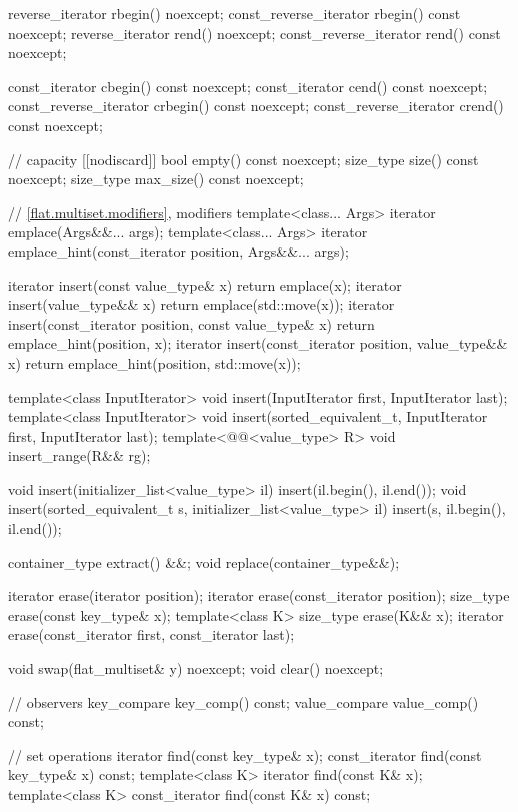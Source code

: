 \begin{codeblock}
{{    reverse_iterator       rbegin() noexcept;
    const_reverse_iterator rbegin() const noexcept;
    reverse_iterator       rend() noexcept;
    const_reverse_iterator rend() const noexcept;

    const_iterator         cbegin() const noexcept;
    const_iterator         cend() const noexcept;
    const_reverse_iterator crbegin() const noexcept;
    const_reverse_iterator crend() const noexcept;

    // capacity
    [[nodiscard]] bool empty() const noexcept;
    size_type size() const noexcept;
    size_type max_size() const noexcept;

    // \ref{flat.multiset.modifiers}, modifiers
    template<class... Args> iterator emplace(Args&&... args);
    template<class... Args>
      iterator emplace_hint(const_iterator position, Args&&... args);

    iterator insert(const value_type& x)
      { return emplace(x); }
    iterator insert(value_type&& x)
      { return emplace(std::move(x)); }
    iterator insert(const_iterator position, const value_type& x)
      { return emplace_hint(position, x); }
    iterator insert(const_iterator position, value_type&& x)
      { return emplace_hint(position, std::move(x)); }

    template<class InputIterator>
      void insert(InputIterator first, InputIterator last);
    template<class InputIterator>
      void insert(sorted_equivalent_t, InputIterator first, InputIterator last);
    template<@@<value_type> R>
      void insert_range(R&& rg);

    void insert(initializer_list<value_type> il)
      { insert(il.begin(), il.end()); }
    void insert(sorted_equivalent_t s, initializer_list<value_type> il)
      { insert(s, il.begin(), il.end()); }

    container_type extract() &&;
    void replace(container_type&&);

    iterator erase(iterator position);
    iterator erase(const_iterator position);
    size_type erase(const key_type& x);
    template<class K> size_type erase(K&& x);
    iterator erase(const_iterator first, const_iterator last);

    void swap(flat_multiset& y) noexcept;
    void clear() noexcept;

    // observers
    key_compare key_comp() const;
    value_compare value_comp() const;

    // set operations
    iterator find(const key_type& x);
    const_iterator find(const key_type& x) const;
    template<class K> iterator find(const K& x);
    template<class K> const_iterator find(const K& x) const;

}}
\end{codeblock}
